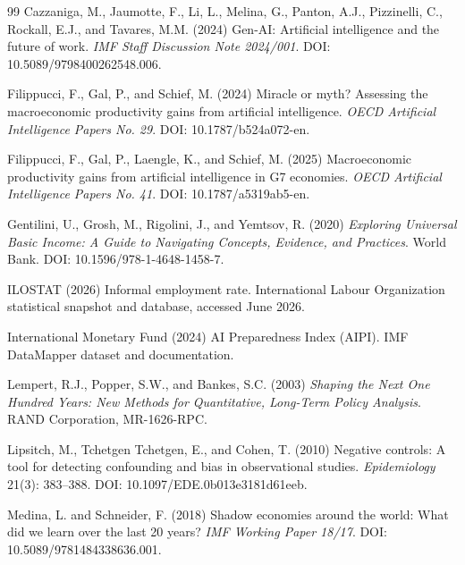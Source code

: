 \documentclass[11pt,a4paper]{article}
\begin{document}
\begin{thebibliography}{99}
Cazzaniga, M., Jaumotte, F., Li, L., Melina, G., Panton, A.J., Pizzinelli, C., Rockall, E.J., and Tavares, M.M. (2024)
\newblock Gen-AI: Artificial intelligence and the future of work.
\newblock \emph{IMF Staff Discussion Note 2024/001}. DOI: 10.5089/9798400262548.006.



Filippucci, F., Gal, P., and Schief, M. (2024)
\newblock Miracle or myth? Assessing the macroeconomic productivity gains from artificial intelligence.
\newblock \emph{OECD Artificial Intelligence Papers No. 29}. DOI: 10.1787/b524a072-en.


Filippucci, F., Gal, P., Laengle, K., and Schief, M. (2025)
\newblock Macroeconomic productivity gains from artificial intelligence in G7 economies.
\newblock \emph{OECD Artificial Intelligence Papers No. 41}. DOI: 10.1787/a5319ab5-en.


Gentilini, U., Grosh, M., Rigolini, J., and Yemtsov, R. (2020)
\newblock \emph{Exploring Universal Basic Income: A Guide to Navigating Concepts, Evidence, and Practices}.
\newblock World Bank. DOI: 10.1596/978-1-4648-1458-7.


ILOSTAT (2026)
\newblock Informal employment rate.
\newblock International Labour Organization statistical snapshot and database, accessed June 2026.

International Monetary Fund (2024)
\newblock AI Preparedness Index (AIPI).
\newblock IMF DataMapper dataset and documentation.

Lempert, R.J., Popper, S.W., and Bankes, S.C. (2003)
\newblock \emph{Shaping the Next One Hundred Years: New Methods for Quantitative, Long-Term Policy Analysis}.
\newblock RAND Corporation, MR-1626-RPC.



Lipsitch, M., Tchetgen Tchetgen, E., and Cohen, T. (2010)
\newblock Negative controls: A tool for detecting confounding and bias in observational studies.
\newblock \emph{Epidemiology} 21(3): 383--388. DOI: 10.1097/EDE.0b013e3181d61eeb.

Medina, L. and Schneider, F. (2018)
\newblock Shadow economies around the world: What did we learn over the last 20 years?
\newblock \emph{IMF Working Paper 18/17}. DOI: 10.5089/9781484338636.001.


\end{thebibliography}
\end{document}
